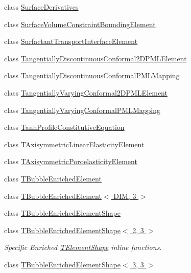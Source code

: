 \begin{DoxyCompactItemize}
class \hyperlink{classoomph_1_1SurfaceDerivatives}{Surface\+Derivatives}
\item 
class \hyperlink{classoomph_1_1SurfaceVolumeConstraintBoundingElement}{Surface\+Volume\+Constraint\+Bounding\+Element}
\item 
class \hyperlink{classoomph_1_1SurfactantTransportInterfaceElement}{Surfactant\+Transport\+Interface\+Element}
\item 
class \hyperlink{classoomph_1_1TangentiallyDiscontinuousConformal2DPMLElement}{Tangentially\+Discontinuous\+Conformal2\+D\+P\+M\+L\+Element}
\item 
class \hyperlink{classoomph_1_1TangentiallyDiscontinuousConformalPMLMapping}{Tangentially\+Discontinuous\+Conformal\+P\+M\+L\+Mapping}
\item 
class \hyperlink{classoomph_1_1TangentiallyVaryingConformal2DPMLElement}{Tangentially\+Varying\+Conformal2\+D\+P\+M\+L\+Element}
\item 
class \hyperlink{classoomph_1_1TangentiallyVaryingConformalPMLMapping}{Tangentially\+Varying\+Conformal\+P\+M\+L\+Mapping}
\item 
class \hyperlink{classoomph_1_1TanhProfileConstitutiveEquation}{Tanh\+Profile\+Constitutive\+Equation}
\item 
class \hyperlink{classoomph_1_1TAxisymmetricLinearElasticityElement}{T\+Axisymmetric\+Linear\+Elasticity\+Element}
\item 
class \hyperlink{classoomph_1_1TAxisymmetricPoroelasticityElement}{T\+Axisymmetric\+Poroelasticity\+Element}
\item 
class \hyperlink{classoomph_1_1TBubbleEnrichedElement}{T\+Bubble\+Enriched\+Element}
\item 
class \hyperlink{classoomph_1_1TBubbleEnrichedElement_3_01DIM_00_013_01_4}{T\+Bubble\+Enriched\+Element$<$ D\+I\+M, 3 $>$}
\item 
class \hyperlink{classoomph_1_1TBubbleEnrichedElementShape}{T\+Bubble\+Enriched\+Element\+Shape}
\item 
class \hyperlink{classoomph_1_1TBubbleEnrichedElementShape_3_012_00_013_01_4}{T\+Bubble\+Enriched\+Element\+Shape$<$ 2, 3 $>$}
\begin{DoxyCompactList}\small\item\em Specific Enriched \hyperlink{classoomph_1_1TElementShape}{T\+Element\+Shape} inline functions. \end{DoxyCompactList}\item 
class \hyperlink{classoomph_1_1TBubbleEnrichedElementShape_3_013_00_013_01_4}{T\+Bubble\+Enriched\+Element\+Shape$<$ 3, 3 $>$}

\end{DoxyCompactItemize}
